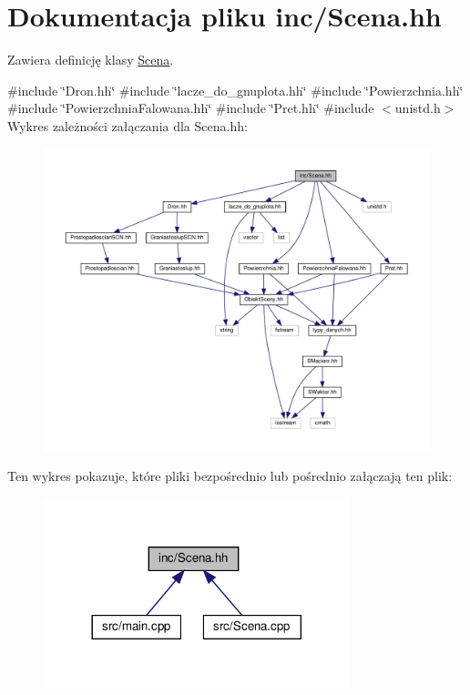 \hypertarget{Scena_8hh}{}\section{Dokumentacja pliku inc/\+Scena.hh}
\label{Scena_8hh}


Zawiera definicję klasy \hyperlink{classScena}{Scena}.  


{\ttfamily \#include \char`\"{}Dron.\+hh\char`\"{}}\newline
{\ttfamily \#include \char`\"{}lacze\+\_\+do\+\_\+gnuplota.\+hh\char`\"{}}\newline
{\ttfamily \#include \char`\"{}Powierzchnia.\+hh\char`\"{}}\newline
{\ttfamily \#include \char`\"{}Powierzchnia\+Falowana.\+hh\char`\"{}}\newline
{\ttfamily \#include \char`\"{}Pret.\+hh\char`\"{}}\newline
{\ttfamily \#include $<$unistd.\+h$>$}\newline
Wykres zależności załączania dla Scena.\+hh\+:\nopagebreak
\begin{figure}[H]
\begin{center}
\leavevmode
\includegraphics[width=350pt]{Scena_8hh__incl}
\end{center}
\end{figure}
Ten wykres pokazuje, które pliki bezpośrednio lub pośrednio załączają ten plik\+:\nopagebreak
\begin{figure}[H]
\begin{center}
\leavevmode
\includegraphics[width=252pt]{Scena_8hh__dep__incl}
\end{center}
\end{figure}

